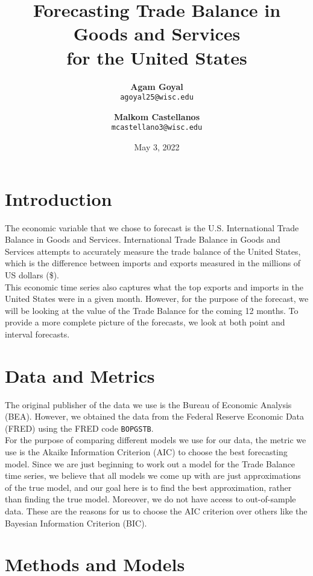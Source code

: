 \documentclass[12pt]{article}
\title{\vspace{-3cm}Forecasting Trade Balance in Goods and Services\\ for the United States}
\author{
  \textbf{Agam Goyal}\\
  \texttt{agoyal25@wisc.edu}
  \and
  \textbf{Malkom Castellanos}\\
  \texttt{mcastellano3@wisc.edu}
}
\date{May 3, 2022}
\begin{document}
\maketitle

\section{Introduction}

The economic variable that we chose to forecast is the U.S. International Trade Balance in Goods and Services. International Trade Balance in Goods and Services attempts to accurately measure the trade balance of the United States, which is the difference between imports and exports measured in the millions of US dollars (\$).\\

This economic time series also captures what the top exports and imports in the United States were in a given month. However, for the purpose of the forecast, we will be looking at the value of the Trade Balance for the coming 12 months. To provide a more complete picture of the forecasts, we look at both point and interval forecasts.

\section{Data and Metrics}

The original publisher of the data we use is the Bureau of Economic Analysis (BEA). However, we obtained the data from the Federal Reserve Economic Data (FRED)\cite{data} using the FRED code \texttt{BOPGSTB}.\\

For the purpose of comparing different models we use for our data, the metric we use is the Akaike Information Criterion (AIC) to choose the best forecasting model. Since we are just beginning to work out a model for the Trade Balance time series, we believe that all models we come up with are just approximations of the true model, and our goal here is to find the best approximation, rather than finding the true model\cite{aic}. Moreover, we do not have access to out-of-sample data. These are the reasons for us to choose the AIC criterion over others like the Bayesian Information Criterion (BIC).

\section{Methods and Models}
\end{document}

